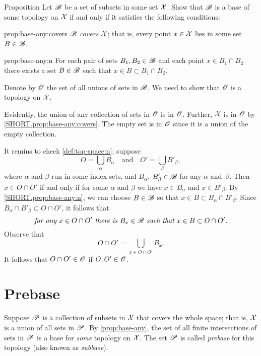 \begin{thm}{Proposition}\label{prop:base-any}
Let $\mathscr{B}$ be a set of subsets in some set $\mathcal{X}$.
Show that $\mathscr{B}$ is a base of some topology on $\mathcal{X}$ if and only if it satisfies the following conditions:

\begin{subthm}{prop:base-any:covers}
$\mathscr{B}$ {}\emph{covers} $\mathcal{X}$;
that is, every point $x\in\mathcal{X}$ lies in some set $B\in \mathscr{B}$.
\end{subthm}

\begin{subthm}{prop:base-any:n}
For each pair of sets $B_1, B_2\in \mathscr{B}$ and each point $x \in B_1 \cap B_2$ there exists a set $B
\in \mathscr{B}$ such that $x\in B\subset B_1 \cap B_2$.
\end{subthm}

\end{thm}

Denote by $\mathscr{O}$ the set of all unions of sets in $\mathscr{B}$.
We need to show that $\mathscr{O}$ is a topology on $\mathcal{X}$.

Evidently, the union of any collection of sets in $\mathscr{O}$ is in $\mathscr{O}$.
Further, $\mathcal{X}$ is in $\mathscr{O}$ by \ref{SHORT.prop:base-any:covers}.
The empty set is in $\mathscr{O}$ since it is a union of the empty collection.

It remins to check \ref{def:top-space:n}; suppose 
\[O=\bigcup_\alpha B_\alpha
\quad\text{and}\quad
O'=\bigcup_\beta B'_\beta,
\]
where $\alpha$ and $\beta$ run in some index sets, and $B_\alpha$, $B'_\beta\in \mathscr{B}$ for any $\alpha$ and~$\beta$.
Then $x\in O\cap O'$ if and only if for some $\alpha$ and $\beta$ we have $x\in B_\alpha$ and $x\in B'_\beta$.
By \ref{SHORT.prop:base-any:n}, we can choose $B\in \mathscr{B}$ so that $x\in B\subset B_\alpha \cap B'_\beta$.
Since $B_\alpha \cap B'_\beta\subset O\cap O'$, it follows that 
\[\textit{for any $x\in O\cap O'$ there is $B_x\in\mathscr{B}$ such that 
$x\in B\subset O\cap O'$.}\]
Observe that 
\[O\cap O'=\bigcup_{x\in O\cap O'} B_x.\]
It follows that $O\cap O'\in\mathscr{O}$ if $O,O'\in\mathscr{O}$.
\qeds

\section{Prebase}\label{prebase}

Suppose $\mathscr{P}$ is a collection of subsets in $\mathcal{X}$ that covers the whole space;
that is, $\mathcal{X}$ is a union of all sets in $\mathscr{P}$.
By \ref{prop:base-any}, the set of all finite intersections of sets in $\mathscr{P}$ is a base for \textit{some} topology on $\mathcal{X}$.
The set $\mathscr{P}$ is called \emph{prebase} for this topology (also known as \emph{subbase}).

